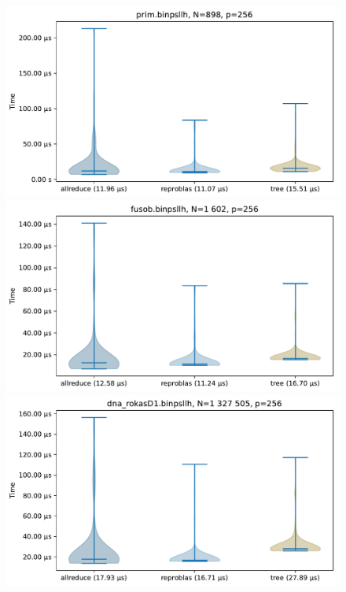 \begin{figure}\centering\ContinuedFloat
\includegraphics[scale=\mScale]{figures/violinPrim.pdf}
\includegraphics[scale=\mScale]{figures/violinFusob.pdf}
\includegraphics[scale=\mScale]{figures/violinRokasD1.pdf}

\end{figure}
